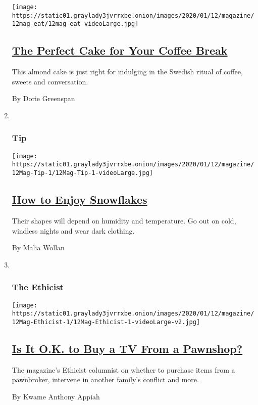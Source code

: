 \begin{enumerate}
  \texttt{[image: https://static01.graylady3jvrrxbe.onion/images/2020/01/12/magazine/12mag-eat/12mag-eat-videoLarge.jpg]}

  \hypertarget{the-perfect-cake-for-your-coffee-break}{%
  \subsection{\texorpdfstring{\href{/2020/01/08/magazine/swedish-almond-cake-recipe.html}{The
  Perfect Cake for Your Coffee
  Break}}{The Perfect Cake for Your Coffee Break}}\label{the-perfect-cake-for-your-coffee-break}}

  This almond cake is just right for indulging in the Swedish ritual of
  coffee, sweets and conversation.

  By Dorie Greenspan
\item ~
  \hypertarget{tip}{%
  \subsubsection{Tip}\label{tip}}

  \texttt{[image: https://static01.graylady3jvrrxbe.onion/images/2020/01/12/magazine/12Mag-Tip-1/12Mag-Tip-1-videoLarge.jpg]}

  \hypertarget{how-to-enjoy-snowflakes}{%
  \subsection{\texorpdfstring{\href{/2020/01/07/magazine/how-to-enjoy-snowflakes.html}{How
  to Enjoy
  Snowflakes}}{How to Enjoy Snowflakes}}\label{how-to-enjoy-snowflakes}}

  Their shapes will depend on humidity and temperature. Go out on cold,
  windless nights and wear dark clothing.

  By Malia Wollan
\item ~
  \hypertarget{the-ethicist}{%
  \subsubsection{The Ethicist}\label{the-ethicist}}

  \texttt{[image: https://static01.graylady3jvrrxbe.onion/images/2020/01/12/magazine/12Mag-Ethicist-1/12Mag-Ethicist-1-videoLarge-v2.jpg]}

  \hypertarget{is-it-ok-to-buy-a-tv-from-a-pawnshop}{%
  \subsection{\texorpdfstring{\href{/2020/01/07/magazine/is-it-ok-to-buy-a-tv-from-a-pawnshop.html}{Is
  It O.K. to Buy a TV From a
  Pawnshop?}}{Is It O.K. to Buy a TV From a Pawnshop?}}\label{is-it-ok-to-buy-a-tv-from-a-pawnshop}}

  The magazine's Ethicist columnist on whether to purchase items from a
  pawnbroker, intervene in another family's conflict and more.

  By Kwame Anthony Appiah
\end{enumerate}

